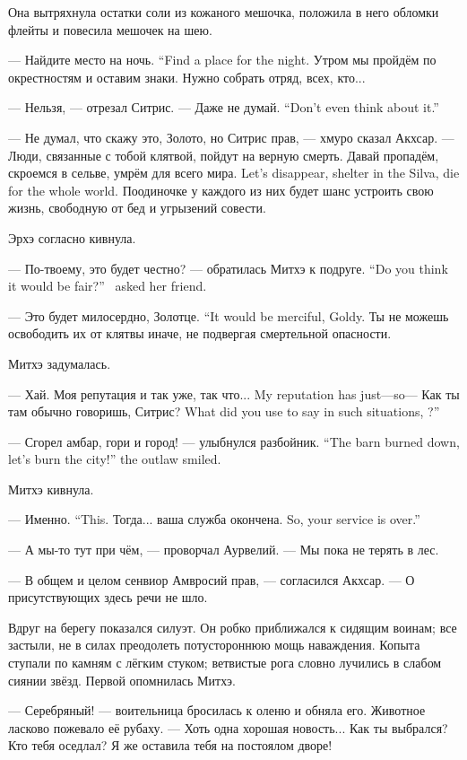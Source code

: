 Она вытряхнула остатки соли из кожаного мешочка, положила в него обломки флейты и повесила мешочек на шею.

{--- Найдите место на ночь.}
{``Find a place for the night.}
Утром мы пройдём по окрестностям и оставим знаки.
Нужно собрать отряд, всех, кто...

--- Нельзя, --- отрезал Ситрис.
{--- Даже не думай.}
{``Don't even think about it.''}

--- Не думал, что скажу это, Золото, но Ситрис прав, --- хмуро сказал Акхсар.
--- Люди, связанные с тобой клятвой, пойдут на верную смерть.
{Давай пропадём, скроемся в сельве, умрём для всего мира.}
{Let's disappear, shelter in the Silva, die for the whole world.}
Поодиночке у каждого из них будет шанс устроить свою жизнь, свободную от бед и угрызений совести.

Эрхэ согласно кивнула.

{--- По-твоему, это будет честно? --- обратилась Митхэ к подруге.}
{``Do you think it would be fair?'' \Mitchoe\ asked her friend.}

{--- Это будет милосердно, Золотце.}
{``It would be merciful, Goldy.}
Ты не можешь освободить их от клятвы иначе, не подвергая смертельной опасности.

Митхэ задумалась.

--- Хай.
{Моя репутация и так уже, так что...}
{My reputation has just---so---}
{Как ты там обычно говоришь, Ситрис?}
{What did you use to say in such situations, \Sitris?''}

{--- Сгорел амбар, гори и город! --- улыбнулся разбойник.}
{``The barn burned down, let's burn the city!'' the outlaw smiled.}

Митхэ кивнула.

{--- Именно.}
{``This.}
{Тогда... ваша служба окончена.}
{So, your service is over.''}

--- А мы-то тут при чём, --- проворчал Аурвелий.
--- Мы пока не терять в лес.

--- В общем и целом сенвиор Амвросий прав, --- согласился Акхсар.
--- О присутствующих здесь речи не шло.

Вдруг на берегу показался силуэт.
Он робко приближался к сидящим воинам;
все застыли, не в силах преодолеть потустороннюю мощь наваждения.
Копыта ступали по камням с лёгким стуком;
ветвистые рога словно лучились в слабом сиянии звёзд.
Первой опомнилась Митхэ.

--- Серебряный! --- воительница бросилась к оленю и обняла его.
Животное ласково пожевало её рубаху.
--- Хоть одна хорошая новость...
Как ты выбрался?
Кто тебя оседлал?
Я же оставила тебя на постоялом дворе!

